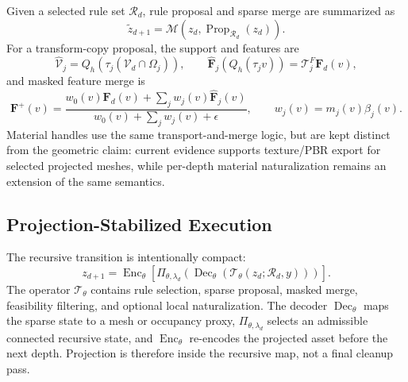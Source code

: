 \documentclass[sigconf,anonymous,review]{acmart}
\begin{document}
Given a selected rule set $\mathcal R_d$, rule proposal and sparse merge are summarized as
\begin{equation}
\tilde z_{d+1}=\mathcal M(z_d,\operatorname{Prop}_{\mathcal R_d}(z_d)).
\end{equation}
For a transform-copy proposal, the support and features are
\begin{equation}
\widehat{\mathcal V}_j=Q_h(\tau_j(\mathcal V_d\cap\Omega_j)),\qquad
\widehat{\mathbf F}_j(Q_h(\tau_jv))=\mathcal T_j^F\mathbf F_d(v),
\end{equation}
and masked feature merge is
\begin{equation}
\mathbf F^+(v)=
\frac{w_0(v)\mathbf F_d(v)+\sum_j w_j(v)\widehat{\mathbf F}_j(v)}
{w_0(v)+\sum_jw_j(v)+\epsilon},
\qquad
w_j(v)=m_j(v)\beta_j(v).
\end{equation}
Material handles use the same transport-and-merge logic, but are kept distinct from the geometric claim: current evidence supports texture/PBR export for selected projected meshes, while per-depth material naturalization remains an extension of the same semantics.

\subsection{Projection-Stabilized Execution}
The recursive transition is intentionally compact:
\begin{equation}
z_{d+1}=
\operatorname{Enc}_{\theta}
\left[
\Pi_{\theta,\lambda_d}
\left(
\operatorname{Dec}_{\theta}
\left(
\mathcal T_{\theta}(z_d;\mathcal R_d,y)
\right)
\right)
\right].
\label{eq:compact-recursive-transition}
\end{equation}
The operator $\mathcal T_{\theta}$ contains rule selection, sparse proposal, masked merge, feasibility filtering, and optional local naturalization. The decoder $\operatorname{Dec}_{\theta}$ maps the sparse state to a mesh or occupancy proxy, $\Pi_{\theta,\lambda_d}$ selects an admissible connected recursive state, and $\operatorname{Enc}_{\theta}$ re-encodes the projected asset before the next depth. Projection is therefore inside the recursive map, not a final cleanup pass.
\end{document}
